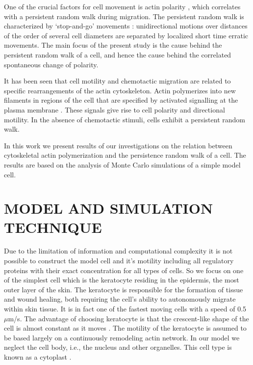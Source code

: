 \documentclass[aps,preprint,pre,array,epsfig,eqsecnum]{revtex4}
\begin{document}
One of the crucial 
factors for cell movement is actin polarity \cite{Weiner02}, 
which correlates with a 
persistent random walk during migration.
The persistent random walk is characterized by `stop-and-go' movements :
unidirectional motions over distances of the
order of several cell diameters are separated by localized short time
erratic movements.
The main focus of the present study 
is the cause behind the persistent random walk of a cell, and hence the
cause behind the correlated spontaneous change of polarity.


It has been seen that cell motility and chemotactic 
migration are related to specific rearrangements of the actin cytoskeleton.
% 
Actin 
polymerizes into new filaments in regions of the cell that are specified by 
activated signalling at the plasma membrane
\cite{Bray92,Lauffenburger96,PollardBorisy03,Carlier03}. These signals give
rise to cell polarity and directional motility. In the absence
of chemotactic stimuli, cells exhibit a persistent random walk.

In this work we present results of our investigations on the
relation between cytoskeletal actin polymerization and the 
persistence random walk of a cell.
The results are based on the analysis of
Monte Carlo simulations of a simple model cell. 

\section{MODEL AND SIMULATION TECHNIQUE}

Due to the limitation of information and computational complexity it 
is not possible to construct the model cell and it's motility including all 
regulatory proteins with their exact concentration for all 
types of cells. So we focus on one of the simplest cell which is the 
keratocyte residing in the epidermis, the most outer layer of the skin.
The keratocyte is responsible for the formation of tissue and wound 
healing, both requiring the cell's ability to autonomously migrate 
within skin tissue.
It is in fact one of the fastest moving cells \cite{Alberts98}
with a speed of 0.5 $\mu$m/s. The advantage of choosing keratocyte is that
the crescent-like shape of the cell 
is almost constant as it moves \cite{Mitchison91,Lee93}.
The motility of the keratocyte is assumed to be based largely on a
continuously remodeling actin network. 
In our model we neglect the cell body, i.e., the
nucleus and other organelles. This cell type is known as a cytoplast
\cite{Borisy99a}.
\end{document}
